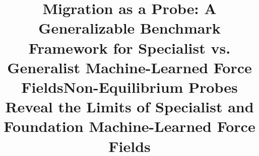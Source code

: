 \documentclass[pdflatex,sn-mathphys-num]{sn-jnl}%
\theoremstyle{thmstyleone}%
\theoremstyle{thmstyletwo}%
\theoremstyle{thmstylethree}%
\begin{document}
\title[Article Title]{Migration as a Probe: A Generalizable Benchmark Framework for Specialist vs. Generalist Machine-Learned Force Fields}
\title[Article Title]{Non-Equilibrium Probes Reveal the Limits of Specialist and Foundation Machine-Learned Force Fields}

\author[1]{ }

\author[1]{ }

\author*[1]{ }



\end{document}
